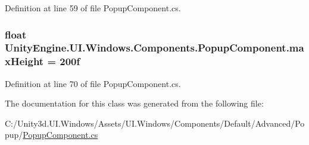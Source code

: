 Definition at line 59 of file Popup\+Component.\+cs.

\hypertarget{class_unity_engine_1_1_u_i_1_1_windows_1_1_components_1_1_popup_component_a1689a910fb5a8e51a2729afe348ee513}{}
\subsubsection[{max\+Height}]{\setlength{\rightskip}{0pt plus 5cm}float Unity\+Engine.\+U\+I.\+Windows.\+Components.\+Popup\+Component.\+max\+Height = 200f}\label{class_unity_engine_1_1_u_i_1_1_windows_1_1_components_1_1_popup_component_a1689a910fb5a8e51a2729afe348ee513}


Definition at line 70 of file Popup\+Component.\+cs.



The documentation for this class was generated from the following file\+:\begin{DoxyCompactItemize}
\item 
C\+:/\+Unity3d.\+U\+I.\+Windows/\+Assets/\+U\+I.\+Windows/\+Components/\+Default/\+Advanced/\+Popup/\hyperlink{_popup_component_8cs}{Popup\+Component.\+cs}\end{DoxyCompactItemize}
